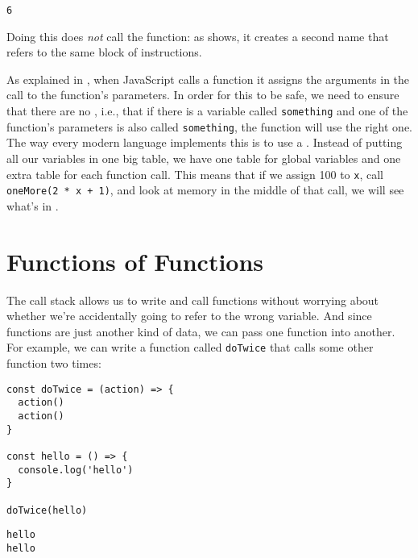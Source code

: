 \begin{verbatim}
6
\end{verbatim}

Doing this does \emph{not} call the function:
as  shows,
it creates a second name that refers to the same block of instructions.


As explained in ,
when JavaScript calls a function it assigns the arguments in the call to the function's parameters.
In order for this to be safe,
we need to ensure that there are no ,
i.e.,
that if there is a variable called \texttt{something} and one of the function's parameters is also called \texttt{something},
the function will use the right one.
The way every modern language implements this is to use a .
Instead of putting all our variables in one big table,
we have one table for global variables
and one extra table for each function call.
This means that if we assign 100 to \texttt{x},
call \texttt{oneMore(2\ *\ x\ +\ 1)},
and look at memory in the middle of that call,
we will see what's in .


\section{Functions of Functions}\label{s:callbacks-func}

The call stack allows us to write and call functions
without worrying about whether we're accidentally going to refer to the wrong variable.
And since functions are just another kind of data,
we can pass one function into another.
For example,
we can write a function called \texttt{doTwice} that calls some other function two times:

\begin{verbatim}
const doTwice = (action) => {
  action()
  action()
}

const hello = () => {
  console.log('hello')
}

doTwice(hello)
\end{verbatim}

\begin{verbatim}
hello
hello
\end{verbatim}

